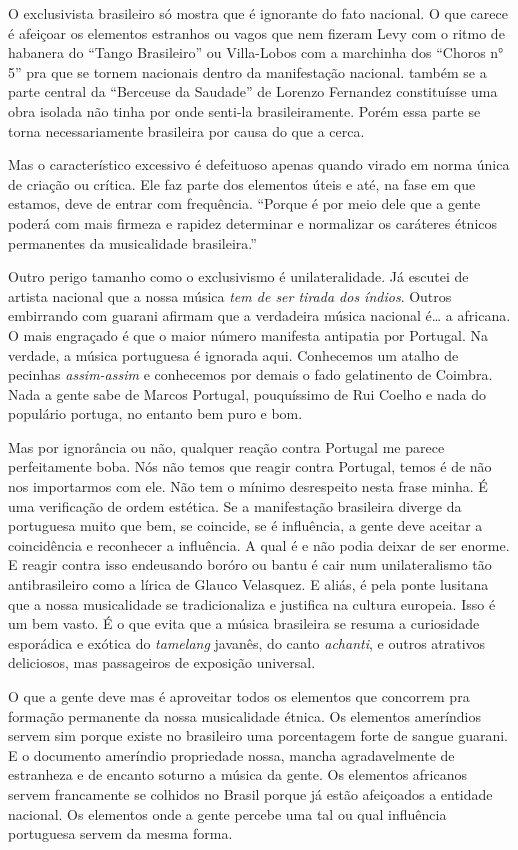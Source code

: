 O exclusivista brasileiro só mostra que é ignorante do fato nacional. O
que carece é afeiçoar os elementos estranhos ou vagos que nem fizeram
Levy com o ritmo de habanera do ``Tango Brasileiro'' ou Villa-Lobos com a
marchinha dos ``Choros n° 5'' pra que se tornem nacionais dentro da
manifestação nacional. também se a parte central da ``Berceuse da
Saudade'' de Lorenzo Fernandez constituísse uma
obra isolada não tinha por onde senti-la brasileiramente. Porém essa
parte se torna necessariamente brasileira por causa do que a cerca.

Mas o característico excessivo é defeituoso apenas quando virado em
norma única de criação ou crítica. Ele faz parte dos elementos úteis e
até, na fase em que estamos, deve de entrar com frequência. ``Porque
é por meio dele que a gente poderá com mais firmeza e rapidez determinar
e normalizar os caráteres étnicos permanentes da musicalidade
brasileira.''

Outro perigo tamanho como o exclusivismo é unilateralidade. Já escutei
de artista nacional que a nossa música \textit{tem de ser tirada dos
índios}. Outros embirrando com guarani afirmam que a verdadeira música
nacional é\ldots{} a africana. O mais engraçado é que o maior número
manifesta antipatia por Portugal. Na verdade, a música portuguesa é
ignorada aqui. Conhecemos um atalho de pecinhas \textit{assim-assim} e conhecemos
por demais o fado gelatinento de Coimbra. Nada a gente sabe de Marcos
Portugal, pouquíssimo de Rui Coelho e nada do populário portuga, no
entanto bem puro e bom.

Mas por ignorância ou não, qualquer reação contra Portugal me parece
perfeitamente boba. Nós não temos que reagir contra Portugal, temos é de
não nos importarmos com ele. Não tem o mínimo desrespeito nesta frase
minha. É uma verificação de ordem estética. Se a manifestação brasileira
diverge da portuguesa muito que bem, se coincide, se é influência, a
gente deve aceitar a coincidência e reconhecer a influência. A qual é e
não podia deixar de ser enorme. E reagir contra isso endeusando boróro
ou bantu é cair num unilateralismo tão antibrasileiro como a lírica de
Glauco Velasquez. E aliás, é pela ponte lusitana que a nossa
musicalidade se tradicionaliza e justifica na cultura europeia. Isso é
um bem vasto. É o que evita que a música brasileira se resuma a
curiosidade esporádica e exótica do \textit{tamelang} javanês, do canto \textit{achanti},
e outros atrativos deliciosos, mas passageiros de exposição universal.

O que a gente deve mas é aproveitar todos os elementos que concorrem pra
formação permanente da nossa musicalidade étnica. Os elementos
ameríndios servem sim porque existe no brasileiro uma porcentagem forte
de sangue guarani. E o documento ameríndio propriedade nossa, mancha
agradavelmente de estranheza e de encanto soturno a música da gente. Os
elementos africanos servem francamente se colhidos no Brasil porque já
estão afeiçoados a entidade nacional. Os elementos onde a gente percebe
uma tal ou qual influência portuguesa servem da mesma forma.

